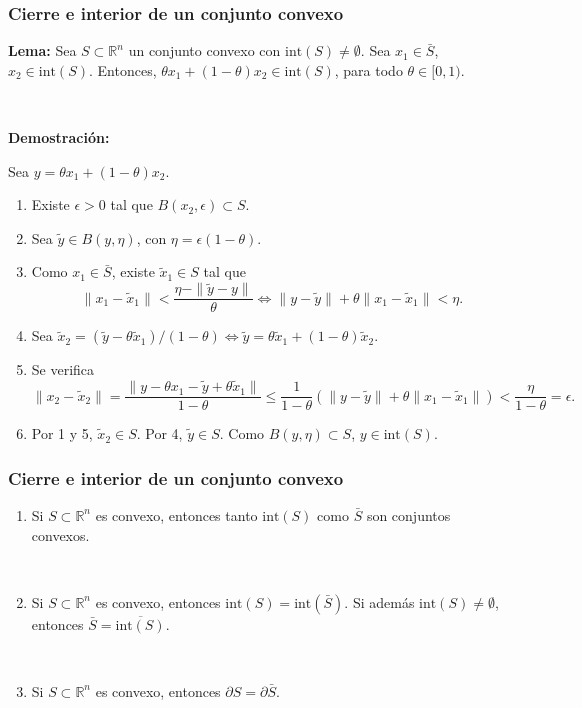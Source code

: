 \documentclass{beamer}
\begin{document}
\begin{frame}
\frametitle{Cierre e interior de un conjunto convexo}


\textbf{Lema:} 
Sea $S\subset\mathbb{R}^n$ un conjunto convexo con $\mbox{int}(S)\neq\emptyset$. Sea $x_1\in \bar{S}$, $x_2\in\mbox{int}(S)$. Entonces, $\theta x_1+ (1-\theta) x_2 \in\mbox{int}(S)$, para todo $\theta\in [0,1)$.

\

{\scriptsize
\textbf{Demostración:}

Sea $y=\theta x_1+ (1-\theta)x_2$.

\begin{enumerate}
\item Existe $\epsilon>0$ tal que $B(x_2,\epsilon)\subset S$.
\item Sea $\tilde{y}\in B(y,\eta)$, con $\eta=\epsilon(1-\theta)$.
\item Como $x_1\in\bar{S}$, existe $\tilde{x}_1\in S$ tal que 
\[
\|x_1-\tilde{x}_1\| < \frac{\eta-\|\tilde{y}-y\|}{\theta}
\Leftrightarrow \|y-\tilde{y}\| + \theta \|x_1 - \tilde{x}_1\| < \eta.
\]
\item Sea $\tilde{x}_2=(\tilde{y} - \theta \tilde{x}_1)/(1-\theta) \Leftrightarrow 
\tilde{y}=\theta \tilde{x}_1 + (1-\theta) \tilde{x}_2$.
\item Se verifica
\[
\|x_2-\tilde{x}_2\| = \frac{\|y-\theta x_1 - \tilde{y}+\theta\tilde{x}_1\|}{1-\theta}\leq  
\frac{1}{1-\theta}(\|y-\tilde{y}\| + \theta \|x_1 - \tilde{x}_1\|)<\frac{\eta}{1-\theta} = \epsilon.
\]
\item Por 1 y 5, $\tilde{x}_2\in S$. Por 4, $\tilde{y}\in S$. Como $B(y,\eta)\subset S$, $y\in \mbox{int}(S)$.



\end{enumerate}
}
\end{frame}
\begin{frame}
\frametitle{Cierre e interior de un conjunto convexo}



\begin{enumerate}

\item Si $S\subset\mathbb{R}^n$ es convexo, entonces tanto $\mbox{int}(S)$ como $\bar{S}$ son conjuntos convexos.

\

\item Si $S\subset\mathbb{R}^n$ es convexo, entonces $\mbox{int}(S)=\mbox{int}(\bar{S})$. Si además $\mbox{int}(S)\neq \emptyset$, entonces $\bar{S}=\overline{\mbox{int}(S)}$.


\

\item Si $S\subset\mathbb{R}^n$ es convexo, entonces $\partial S=\partial \bar{S}$.


\end{enumerate}


\end{frame}
\end{document}
